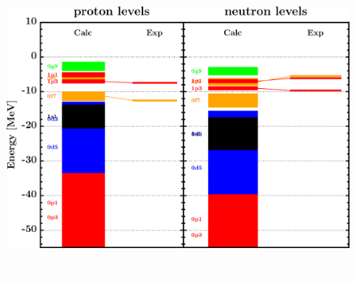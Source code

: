 \documentclass[twocolumn,secnumarabic,amssymb, nobibnotes, aps, prl,
superscriptaddress, nobalancelastpage, draft]{revtex4}
\begin{document}
\begin{figure}[!htb]
\begin{minipage}{0.4\linewidth}
        \label{DOM_ni64_chargeDensity}
    \end{minipage}
    \begin{minipage}{0.35\linewidth}
        \centering
        \includegraphics[width=\linewidth]{figures/ni64_SPLevels.png}
        \label{DOM_ni64_SPLevels}
    \end{minipage}
    \begin{minipage}{0.4\linewidth}
        \centering
        \includegraphics[width=\linewidth]{figures/ni64_RMSRadius.png}

\end{minipage}
\end{figure}
\end{document}
